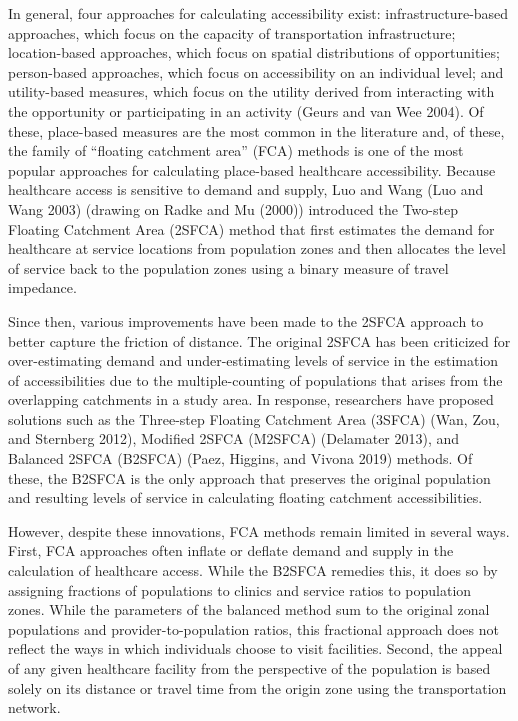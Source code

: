 \documentclass{article}
\begin{document}
In general, four approaches for calculating accessibility exist:
infrastructure-based approaches, which focus on the capacity of
transportation infrastructure; location-based approaches, which focus on
spatial distributions of opportunities; person-based approaches, which
focus on accessibility on an individual level; and utility-based
measures, which focus on the utility derived from interacting with the
opportunity or participating in an activity (Geurs and van Wee 2004). Of
these, place-based measures are the most common in the literature and,
of these, the family of ``floating catchment area'' (FCA) methods is one
of the most popular approaches for calculating place-based healthcare
accessibility. Because healthcare access is sensitive to demand and
supply, Luo and Wang (Luo and Wang 2003) (drawing on Radke and Mu
(2000)) introduced the Two-step Floating Catchment Area (2SFCA) method
that first estimates the demand for healthcare at service locations from
population zones and then allocates the level of service back to the
population zones using a binary measure of travel impedance.

Since then, various improvements have been made to the 2SFCA approach to
better capture the friction of distance. The original 2SFCA has been
criticized for over-estimating demand and under-estimating levels of
service in the estimation of accessibilities due to the
multiple-counting of populations that arises from the overlapping
catchments in a study area. In response, researchers have proposed
solutions such as the Three-step Floating Catchment Area (3SFCA) (Wan,
Zou, and Sternberg 2012), Modified 2SFCA (M2SFCA) (Delamater 2013), and
Balanced 2SFCA (B2SFCA) (Paez, Higgins, and Vivona 2019) methods. Of
these, the B2SFCA is the only approach that preserves the original
population and resulting levels of service in calculating floating
catchment accessibilities.

However, despite these innovations, FCA methods remain limited in
several ways. First, FCA approaches often inflate or deflate demand and
supply in the calculation of healthcare access. While the B2SFCA
remedies this, it does so by assigning fractions of populations to
clinics and service ratios to population zones. While the parameters of
the balanced method sum to the original zonal populations and
provider-to-population ratios, this fractional approach does not reflect
the ways in which individuals choose to visit facilities. Second, the
appeal of any given healthcare facility from the perspective of the
population is based solely on its distance or travel time from the
origin zone using the transportation network.
\end{document}
